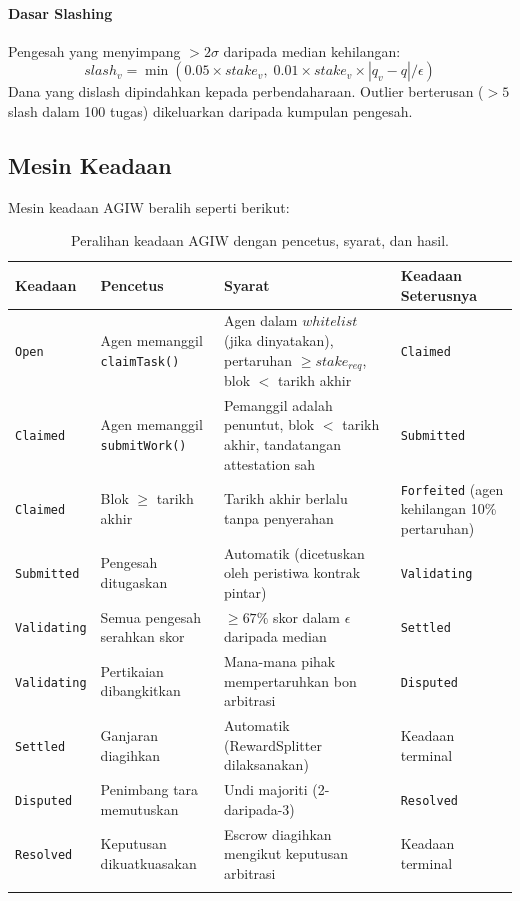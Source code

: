 \documentclass[11pt]{article}
\begin{document}
\paragraph{Dasar Slashing} Pengesah yang menyimpang $>2\sigma$ daripada median kehilangan:
\begin{equation}
slash_v = \min(0.05 \times stake_v, \; 0.01 \times stake_v \times |q_v - q| / \epsilon)
\end{equation}
Dana yang dislash dipindahkan kepada perbendaharaan. Outlier berterusan ($>5$ slash dalam 100 tugas) dikeluarkan daripada kumpulan pengesah.

\subsection{Mesin Keadaan}
\label{sec:agiw-state-machine}
Mesin keadaan AGIW beralih seperti berikut:
\begin{longtable}{@{}p{}p{}p{}p{}@{}}
\toprule
\textbf{Keadaan} & \textbf{Pencetus} & \textbf{Syarat} & \textbf{Keadaan Seterusnya} \\\midrule
\texttt{Open} & Agen memanggil \texttt{claimTask()} & Agen dalam $whitelist$ (jika dinyatakan), pertaruhan $\geq stake_{req}$, blok $<$ tarikh akhir & \texttt{Claimed} \\
\texttt{Claimed} & Agen memanggil \texttt{submitWork()} & Pemanggil adalah penuntut, blok $<$ tarikh akhir, tandatangan attestation sah & \texttt{Submitted} \\
\texttt{Claimed} & Blok $\geq$ tarikh akhir & Tarikh akhir berlalu tanpa penyerahan & \texttt{Forfeited} (agen kehilangan 10\% pertaruhan) \\
\texttt{Submitted} & Pengesah ditugaskan & Automatik (dicetuskan oleh peristiwa kontrak pintar) & \texttt{Validating} \\
\texttt{Validating} & Semua pengesah serahkan skor & $\geq 67\%$ skor dalam $\epsilon$ daripada median & \texttt{Settled} \\
\texttt{Validating} & Pertikaian dibangkitkan & Mana-mana pihak mempertaruhkan bon arbitrasi & \texttt{Disputed} \\
\texttt{Settled} & Ganjaran diagihkan & Automatik (RewardSplitter dilaksanakan) & Keadaan terminal \\
\texttt{Disputed} & Penimbang tara memutuskan & Undi majoriti (2-daripada-3) & \texttt{Resolved} \\
\texttt{Resolved} & Keputusan dikuatkuasakan & Escrow diagihkan mengikut keputusan arbitrasi & Keadaan terminal \\\bottomrule
\caption{Peralihan keadaan AGIW dengan pencetus, syarat, dan hasil.}
\label{tab:agiw-states}
\end{longtable}
\end{document}
